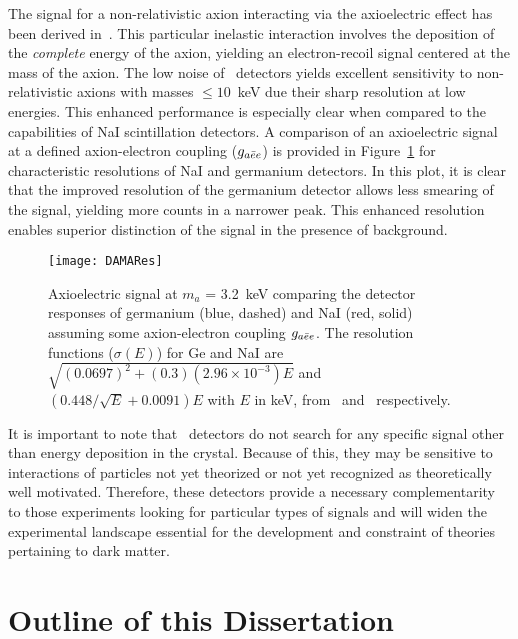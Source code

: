 
	The signal for a non-relativistic axion interacting via the axioelectric effect has been derived in~\cite{Pospelov:2008jk}.  This particular inelastic interaction involves the deposition of the \emph{complete} energy of the axion, yielding an electron-recoil signal centered at the mass of the axion.  The low noise of \ppc~detectors yields excellent sensitivity to non-relativistic axions with masses $\leq10$~keV due their sharp resolution at low energies.  This enhanced performance is especially clear when compared to the capabilities of NaI scintillation detectors.  A comparison of an axioelectric signal at a defined axion-electron coupling ($g_{a\bar{e}e}$) is provided in Figure~\ref{fig:ResCompare} for characteristic resolutions of NaI and germanium detectors.  In this plot, it is clear that the improved resolution of the germanium detector allows less smearing of the signal, yielding more counts in a narrower peak.  This enhanced resolution enables superior distinction of the signal in the presence of background.
	
		\begin{figure}
			\centering
			\texttt{[image: DAMARes]}
			\caption[Axioelectric signal at $m_{a}$ = 3.2~keV]{Axioelectric signal at $m_{a}$ = 3.2~keV comparing 
			the detector responses of germanium (blue, dashed) and NaI (red, solid) assuming some axion-electron coupling $g_{a\bar{e}e}$.  The resolution functions ($\sigma(E)$) for Ge and NaI are $\sqrt{(0.0697)^{2} + (0.3)(2.96\times10^{-3})E}$ and
			$(0.448/\sqrt{E} + 0.0091) E$ with $E$ in keV, from~\cite{Aalseth:2008aa} and~\cite{Bernabei2008297} respectively.} 
			\label{fig:ResCompare}
		\end{figure}
	
	It is important to note that \ppc~detectors do not search for any specific signal other than energy deposition in the crystal.
Because of this, they may be sensitive to interactions of particles not yet theorized or not yet recognized as theoretically 
well motivated.  Therefore, these detectors provide a necessary complementarity to those experiments looking for particular types
of signals and will widen the experimental landscape essential for the development and constraint of theories pertaining to dark matter.

	\section{Outline of this Dissertation}


